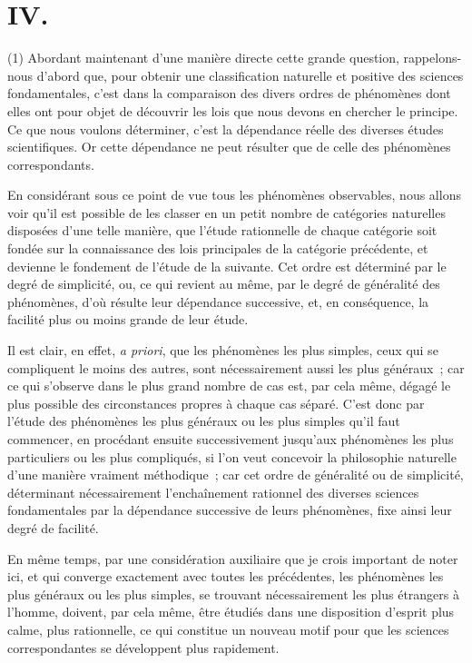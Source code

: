\documentclass[french,twoside]{book} %
\begin{document}
\section[{IV.}]{IV.}
\noindent (1) Abordant maintenant d’une manière directe cette grande question, rappelons-nous d’abord que, pour obtenir une classification naturelle et positive des sciences fondamentales, c’est dans la comparaison des divers ordres de phénomènes dont elles ont pour objet de découvrir les lois que nous devons en chercher le principe. Ce que nous voulons déterminer, c’est la dépendance réelle des diverses études scientifiques. Or cette dépendance ne peut résulter que de celle des phénomènes correspondants.\par
En considérant sous ce point de vue tous les phénomènes observables, nous allons voir qu’il est possible de les classer en un petit nombre de catégories naturelles disposées d’une telle manière, que l’étude rationnelle de chaque catégorie soit fondée sur la connaissance des lois principales de la catégorie précédente, et devienne le fondement de l’étude de la suivante. Cet ordre est déterminé par le degré de simplicité, ou, ce qui revient au même, par le degré de généralité des phénomènes, d’où résulte leur dépendance successive, et, en conséquence, la facilité plus ou moins grande de leur étude.\par
Il est clair, en effet, {\itshape a priori}, que les phénomènes les plus simples, ceux qui se compliquent le moins des autres, sont nécessairement aussi les plus généraux ; car ce qui s’observe dans le plus grand nombre de cas est, par cela même, dégagé le plus possible des circonstances propres à chaque cas séparé. C’est donc par l’étude des phénomènes les plus généraux ou les plus simples qu’il faut commencer, en procédant ensuite successivement jusqu’aux phénomènes les plus particuliers ou les plus compliqués, si l’on veut concevoir la philosophie naturelle d’une manière vraiment méthodique ; car cet ordre de généralité ou de simplicité, déterminant nécessairement l’enchaînement rationnel des diverses sciences fondamentales par la dépendance successive de leurs phénomènes, fixe ainsi leur degré de facilité.\par
En même temps, par une considération auxiliaire que je crois important de noter ici, et qui converge exactement avec toutes les précédentes, les phénomènes les plus généraux ou les plus simples, se trouvant nécessairement les plus étrangers à l’homme, doivent, par cela même, être étudiés dans une disposition d’esprit plus calme, plus rationnelle, ce qui constitue un nouveau motif pour que les sciences correspondantes se développent plus rapidement.\par
\end{document}
